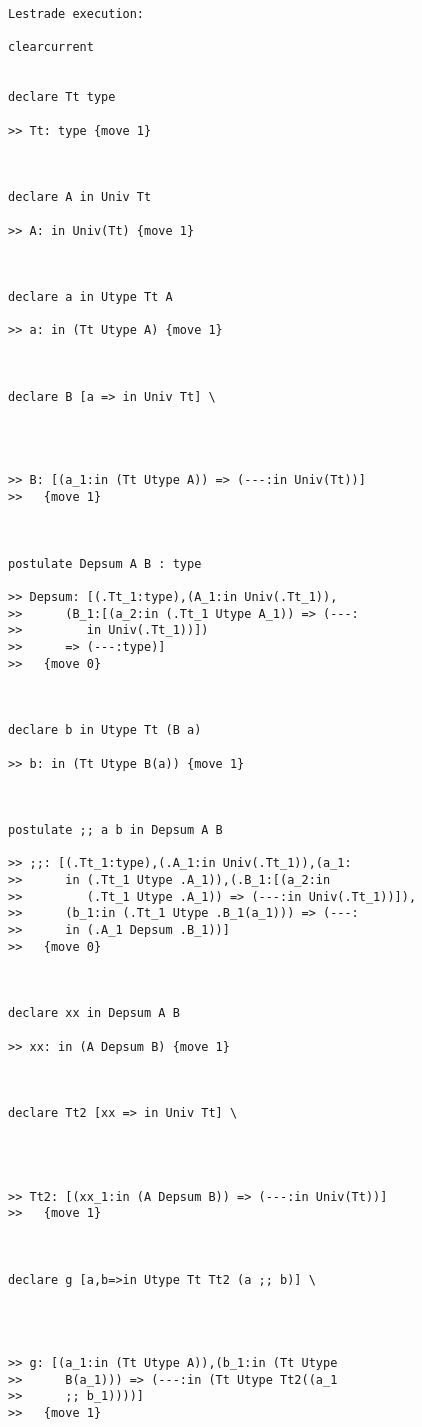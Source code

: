 \documentclass{article}
\begin{document}
\begin{verbatim}Lestrade execution:

clearcurrent


declare Tt type

>> Tt: type {move 1}



declare A in Univ Tt

>> A: in Univ(Tt) {move 1}



declare a in Utype Tt A

>> a: in (Tt Utype A) {move 1}



declare B [a => in Univ Tt] \
   



>> B: [(a_1:in (Tt Utype A)) => (---:in Univ(Tt))]
>>   {move 1}



postulate Depsum A B : type

>> Depsum: [(.Tt_1:type),(A_1:in Univ(.Tt_1)),
>>      (B_1:[(a_2:in (.Tt_1 Utype A_1)) => (---:
>>         in Univ(.Tt_1))])
>>      => (---:type)]
>>   {move 0}



declare b in Utype Tt (B a)

>> b: in (Tt Utype B(a)) {move 1}



postulate ;; a b in Depsum A B

>> ;;: [(.Tt_1:type),(.A_1:in Univ(.Tt_1)),(a_1:
>>      in (.Tt_1 Utype .A_1)),(.B_1:[(a_2:in
>>         (.Tt_1 Utype .A_1)) => (---:in Univ(.Tt_1))]),
>>      (b_1:in (.Tt_1 Utype .B_1(a_1))) => (---:
>>      in (.A_1 Depsum .B_1))]
>>   {move 0}



declare xx in Depsum A B

>> xx: in (A Depsum B) {move 1}



declare Tt2 [xx => in Univ Tt] \
   



>> Tt2: [(xx_1:in (A Depsum B)) => (---:in Univ(Tt))]
>>   {move 1}



declare g [a,b=>in Utype Tt Tt2 (a ;; b)] \
   



>> g: [(a_1:in (Tt Utype A)),(b_1:in (Tt Utype
>>      B(a_1))) => (---:in (Tt Utype Tt2((a_1
>>      ;; b_1))))]
>>   {move 1}




\end{verbatim}
\end{document}
